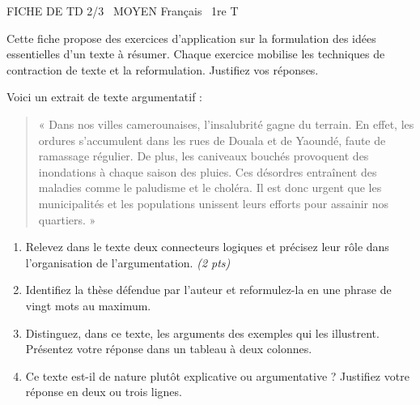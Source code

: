 \documentclass[11pt]{article}
\begin{document}
\begin{tcolorbox}[enhanced,colback=popink,colframe=popink,arc=10pt,boxrule=0pt,left=12pt,right=12pt,top=9pt,bottom=9pt]
{\color{white}\popxbold\small FICHE DE TD 2/3 \textbullet\ MOYEN \hfill Français \textbullet\ 1re T\par}
\end{tcolorbox}
\vspace{4pt}
Cette fiche propose des exercices d'application sur la formulation des idées essentielles d'un texte à résumer. Chaque exercice mobilise les techniques de contraction de texte et la reformulation. Justifiez vos réponses.

\begin{exercice}
Voici un extrait de texte argumentatif :
\begin{quote}
« Dans nos villes camerounaises, l'insalubrité gagne du terrain. En effet, les ordures s'accumulent dans les rues de Douala et de Yaoundé, faute de ramassage régulier. De plus, les caniveaux bouchés provoquent des inondations à chaque saison des pluies. Ces désordres entraînent des maladies comme le paludisme et le choléra. Il est donc urgent que les municipalités et les populations unissent leurs efforts pour assainir nos quartiers. »
\end{quote}
\begin{enumerate}
\item Relevez dans le texte deux connecteurs logiques et précisez leur rôle dans l'organisation de l'argumentation. \textit{(2 pts)}
\item Identifiez la thèse défendue par l'auteur et reformulez-la en une phrase de vingt mots au maximum.
\item Distinguez, dans ce texte, les arguments des exemples qui les illustrent. Présentez votre réponse dans un tableau à deux colonnes.
\item Ce texte est-il de nature plutôt explicative ou argumentative ? Justifiez votre réponse en deux ou trois lignes.
\end{enumerate}
\end{exercice}
\end{document}
